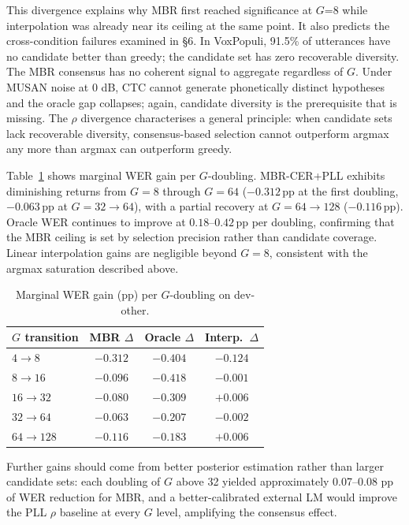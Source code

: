 This divergence explains why MBR first reached significance at $G$=8 while interpolation was already
near its ceiling at the same point. It also predicts the cross-condition failures examined in §6. In
VoxPopuli, 91.5\% of utterances have no candidate better than greedy; the candidate set has zero
recoverable diversity. The MBR consensus has no coherent signal to aggregate regardless of $G$. Under
MUSAN noise at 0 dB, CTC cannot generate phonetically distinct hypotheses and the oracle gap
collapses; again, candidate diversity is the prerequisite that is missing. The $\rho$ divergence
characterises a general principle: when candidate sets lack recoverable diversity, consensus-based
selection cannot outperform argmax any more than argmax can outperform greedy.

Table~\ref{tab:marginal_gain} shows marginal WER gain per $G$-doubling.
MBR-CER+PLL exhibits diminishing returns from $G=8$ through $G=64$
($-0.312$\,pp at the first doubling, $-0.063$\,pp at $G=32 \to 64$),
with a partial recovery at $G=64 \to 128$ ($-0.116$\,pp). Oracle WER
continues to improve at $0.18$--$0.42$\,pp per doubling, confirming that
the MBR ceiling is set by selection precision rather than candidate
coverage. Linear interpolation gains are negligible beyond $G=8$, consistent
with the argmax saturation described above.

\begin{table}[ht]
\caption{Marginal WER gain (pp) per $G$-doubling on dev-other.}
\label{tab:marginal_gain}
\centering
\small
\begin{tabular}{lccc}
\toprule
$G$ transition & MBR $\Delta$ & Oracle $\Delta$ & Interp.\ $\Delta$ \\
\midrule
$4 \to 8$     & $-0.312$ & $-0.404$ & $-0.124$ \\
$8 \to 16$    & $-0.096$ & $-0.418$ & $-0.001$ \\
$16 \to 32$   & $-0.080$ & $-0.309$ & $+0.006$ \\
$32 \to 64$   & $-0.063$ & $-0.207$ & $-0.002$ \\
$64 \to 128$  & $-0.116$ & $-0.183$ & $+0.006$ \\
\bottomrule
\end{tabular}
\end{table}

Further gains should come from better posterior estimation rather than larger candidate sets: each doubling of $G$ above 32 yielded approximately 0.07--0.08 pp of WER reduction for MBR, and a better-calibrated external LM would improve the PLL $\rho$ baseline at every $G$ level, amplifying the consensus effect.



